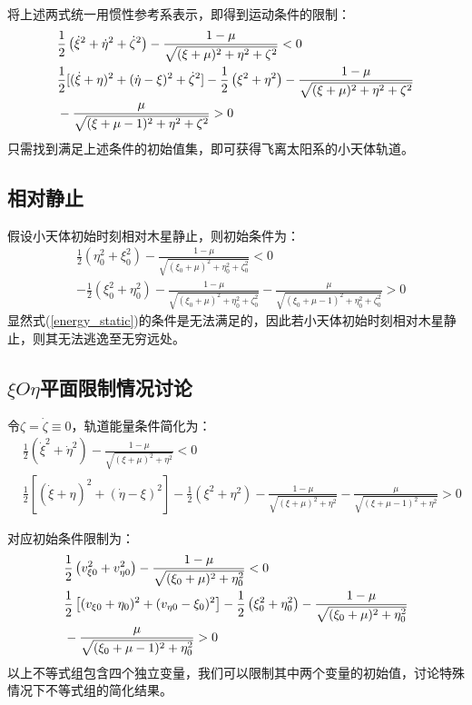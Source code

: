 将上述两式统一用惯性参考系表示，即得到运动条件的限制：
\begin{align}
    &\frac{1}{2}\left(\dot{\xi}^2+\dot{\eta}^2+\dot{\zeta}^2\right)-\frac{1-\mu}{\sqrt{(\xi+\mu)^2+\eta^2+\zeta^2}}<0
    \\&\frac{1}{2}[(\dot{\xi}+\eta)^2+(\dot{\eta}-\xi)^2+\dot{\zeta}^2]-\frac{1}{2}\left(\xi^2+\eta^2\right)-\frac{1-\mu}{\sqrt{(\xi+\mu)^2+\eta^2+\zeta^2}}
    \notag\\&-\frac{\mu}{\sqrt{(\xi+\mu-1)^2+\eta^2+\zeta^2}}>0
\end{align}
只需找到满足上述条件的初始值集，即可获得飞离太阳系的小天体轨道。

\subsection{相对静止}

假设小天体初始时刻相对木星静止，则初始条件为：
\begin{align}
    &\frac{1}{2}\left(\eta_0^2+\xi_0^2\right)-\frac{1-\mu}{\sqrt{(\xi_0+\mu)^2+\eta_0^2+\zeta_0^2}}<0
    \\&-\frac{1}{2}\left(\xi_0^2+\eta_0^2\right)-\frac{1-\mu}{\sqrt{(\xi_0+\mu)^2+\eta_0^2+\zeta_0^2}}-\frac{\mu}{\sqrt{(\xi_0+\mu-1)^2+\eta_0^2+\zeta_0^2}}>0\label{energy_static}
\end{align}
显然式(\ref{energy_static})的条件是无法满足的，因此若小天体初始时刻相对木星静止，则其无法逃逸至无穷远处。

\subsection{$\xi O\eta$平面限制情况讨论}

令$\zeta=\dot{\zeta}\equiv0$，轨道能量条件简化为：
\begin{align}
    &\frac{1}{2}\left(\dot{\xi}^2+\dot{\eta}^2\right)-\frac{1-\mu}{\sqrt{(\xi+\mu)^2+\eta^2}}<0
    \\&\frac{1}{2}[(\dot{\xi}+\eta)^2+(\dot{\eta}-\xi)^2]-\frac{1}{2}\left(\xi^2+\eta^2\right)-\frac{1-\mu}{\sqrt{(\xi+\mu)^2+\eta^2}}-\frac{\mu}{\sqrt{(\xi+\mu-1)^2+\eta^2}}>0
\end{align}

对应初始条件限制为：
\begin{align}
    &\frac{1}{2}\left(v_{\xi0}^2+v_{\eta0}^2\right)-\frac{1-\mu}{\sqrt{(\xi_0+\mu)^2+\eta_0^2}}<0
    \\&\frac{1}{2}\left[(v_{\xi0}+\eta_0)^2+(v_{\eta0}-\xi_0)^2\right]-\frac{1}{2}\left(\xi_0^2+\eta_0^2\right)-\frac{1-\mu}{\sqrt{(\xi_0+\mu)^2+\eta_0^2}}
    \notag\\&-\frac{\mu}{\sqrt{(\xi_0+\mu-1)^2+\eta_0^2}}>0
\end{align}
以上不等式组包含四个独立变量，我们可以限制其中两个变量的初始值，讨论特殊情况下不等式组的简化结果。

